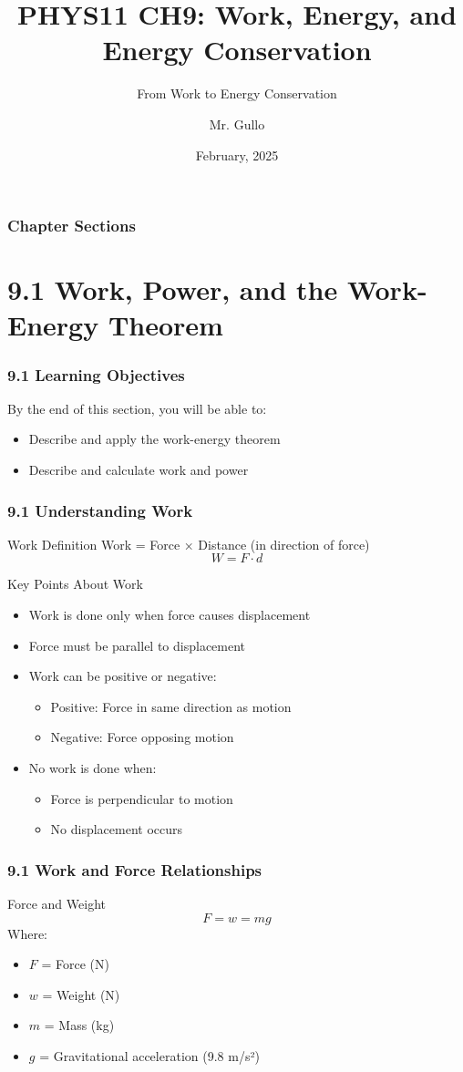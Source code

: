 \documentclass{beamer}
\title[Work \& Energy]{PHYS11 CH9: Work, Energy, and Energy Conservation}
\subtitle{From Work to Energy Conservation}
\author[Mr. Gullo]{Mr. Gullo}
\date[Feb 2025]{February, 2025}
\begin{document}
\frame{\titlepage}

\begin{frame}
\frametitle{Chapter Sections}
\tableofcontents
\end{frame}

\section{9.1 Work, Power, and the Work-Energy Theorem}

\begin{frame}
\frametitle{9.1 Learning Objectives}
By the end of this section, you will be able to:
\begin{itemize}
\item Describe and apply the work-energy theorem
\item Describe and calculate work and power
\end{itemize}
\end{frame}

\begin{frame}
\frametitle{9.1 Understanding Work}
\begin{block}{Work Definition}
Work = Force × Distance (in direction of force)
$$W = F \cdot d$$
\end{block}

\begin{block}{Key Points About Work}
\begin{itemize}
\item Work is done only when force causes displacement
\item Force must be parallel to displacement
\item Work can be positive or negative:
 \begin{itemize}
 \item Positive: Force in same direction as motion
 \item Negative: Force opposing motion
 \end{itemize}
\item No work is done when:
 \begin{itemize}
 \item Force is perpendicular to motion
 \item No displacement occurs
 \end{itemize}
\end{itemize}
\end{block}
\end{frame}

\begin{frame}
\frametitle{9.1 Work and Force Relationships}
\begin{block}{Force and Weight}
$$F = w = mg$$
Where:
\begin{itemize}
\item $F$ = Force (N)
\item $w$ = Weight (N)
\item $m$ = Mass (kg)
\item $g$ = Gravitational acceleration (9.8 m/s²)
\end{itemize}
\end{block}
\end{frame}
\end{document}
